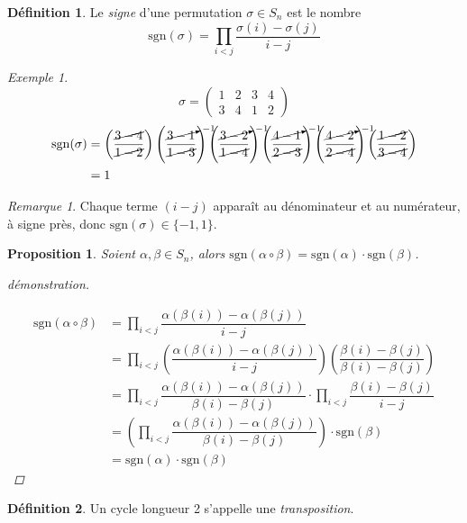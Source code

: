 \documentclass{report}
\newtheorem*{prop}{Proposition}
\theoremstyle{definition}
\newtheorem*{defin}{D\'efinition}
\theoremstyle{remark}
\newtheorem*{exem}{Exemple}
\newtheorem*{rema}{Remarque}
\begin{document}
	\begin{defin}
		Le \emph{signe} d'une permutation $\sigma \in S_n$ est le nombre
		\[
		\mathrm{sgn}(\sigma) = \prod_{i < j}\dfrac{\sigma(i) - \sigma(j)}{i-j}
		\]
	\end{defin}
	\begin{exem}
		\[
		\sigma = \begin{pmatrix}
			1&2&3&4\\
			3&4&1&2
		\end{pmatrix}
		\]
		\begin{align*}
			\mathrm{sgn}(\sigma)&= \left( \dfrac{\cancel{3-4}}{\cancel{1-2}} \right) \left( \dfrac{\cancelto{-1}{3-1}}{\cancel{1-3}} \right) \left( \dfrac{\cancelto{-1}{3-2}}{\cancel{1-4}} \right) \left( \dfrac{\cancelto{-1}{4-1}}{\cancel{2-3}} \right) \left( \dfrac{\cancelto{-1}{4-2}}{\cancel{2-4}} \right) \left( \dfrac{\cancel{1-2}}{\cancel{3-4}} \right)\\
			&=  1
		\end{align*}
	\end{exem}
	\begin{rema}
		Chaque terme $(i-j)$ appara\^it au d\'enominateur et au num\'erateur, \`a signe pr\`es, donc $\mathrm{sgn}(\sigma) \in \{-1,1\}$.
	\end{rema}
	\begin{prop}
		Soient $\alpha, \beta \in S_n$, alors $\mathrm{sgn}(\alpha \circ \beta) = \mathrm{sgn}(\alpha) \cdot \mathrm{sgn}(\beta)$.
		\begin{proof}[d\'emonstration]~

			\begin{align*}
				\mathrm{sgn}(\alpha \circ \beta)&= \prod_{i < j}\dfrac{\alpha(\beta(i)) - \alpha(\beta(j))}{i-j}\\
				&= \prod_{i < j}\left( \dfrac{\alpha(\beta(i)) - \alpha(\beta(j))}{i-j} \right) \left( \dfrac{\beta(i) - \beta(j)}{\beta(i) - \beta(j)} \right)\\
				&= \prod_{i < j}\dfrac{\alpha(\beta(i)) - \alpha(\beta(j))}{\beta(i) - \beta(j)} \cdot \prod_{i < j}\dfrac{\beta(i) - \beta(j)}{i-j}\\
				&= \left( \prod_{i < j}\dfrac{\alpha(\beta(i)) - \alpha(\beta(j))}{\beta(i) - \beta(j)} \right) \cdot \mathrm{sgn}(\beta)\\
				&= \mathrm{sgn}(\alpha) \cdot \mathrm{sgn}(\beta)
			\end{align*}
		\end{proof}
	\end{prop}
	\begin{defin}
		Un cycle longueur 2 s'appelle une \emph{transposition}.
	\end{defin}
\end{document}
